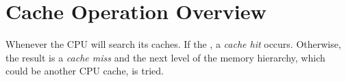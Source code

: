 \section{Cache Operation Overview}

%


%

Whenever
the CPU will search its caches. %
If the , a
\emph{cache hit} occurs.  Otherwise, the result is a \emph{cache miss} and
the next level of the memory hierarchy, which could be another CPU cache, is tried.

